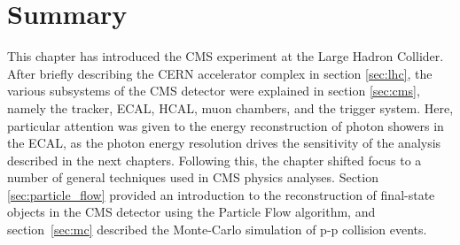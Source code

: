 
\section{Summary}
This chapter has introduced the CMS experiment at the Large Hadron Collider. After briefly describing the CERN accelerator complex in section \ref{sec:lhc}, the various subsystems of the CMS detector were explained in section \ref{sec:cms}, namely the tracker, ECAL, HCAL, muon chambers, and the trigger system. Here, particular attention was given to the energy reconstruction of photon showers in the ECAL, as the photon energy resolution drives the sensitivity of the \Hgg analysis described in the next chapters. Following this, the chapter shifted focus to a number of general techniques used in CMS physics analyses. Section \ref{sec:particle_flow} provided an introduction to the reconstruction of final-state objects in the CMS detector using the Particle Flow algorithm, and section~\ref{sec:mc} described the Monte-Carlo simulation of p-p collision events.

